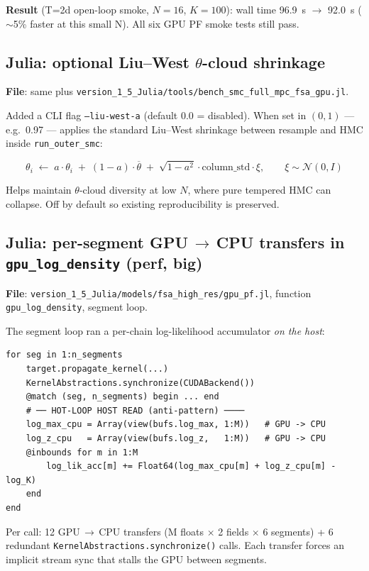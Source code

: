 \documentclass[11pt,a4paper]{article}
\begin{document}
\textbf{Result} (T=2d open-loop smoke, $N=16$, $K=100$): wall
time 96.9~s $\to$ 92.0~s ($\sim$5\% faster at this small N). All
six GPU PF smoke tests still pass.

\subsection{Julia: optional Liu--West $\theta$-cloud shrinkage}

\textbf{File}: same plus
\texttt{version\_1\_5\_Julia/tools/bench\_smc\_full\_mpc\_fsa\_gpu.jl}.

Added a CLI flag \texttt{--liu-west-a} (default 0.0 = disabled).
When set in $(0, 1)$ --- e.g.\ 0.97 --- applies the standard
Liu--West shrinkage between resample and HMC inside
\texttt{run\_outer\_smc}:

\[
  \theta_i \;\leftarrow\; a \cdot \theta_i \;+\; (1-a) \cdot \overline\theta
                  \;+\; \sqrt{1 - a^2} \cdot \text{column\_std} \cdot \xi,
                  \qquad \xi \sim \mathcal{N}(0, I)
\]

Helps maintain $\theta$-cloud diversity at low $N$, where pure
tempered HMC can collapse. Off by default so existing
reproducibility is preserved.

\subsection{Julia: per-segment GPU\,$\to$\,CPU transfers in
            \texttt{gpu\_log\_density} (perf, big)}\label{sec:bug_segment}

\textbf{File}: \texttt{version\_1\_5\_Julia/models/fsa\_high\_res/gpu\_pf.jl},
function \texttt{gpu\_log\_density}, segment loop.

The segment loop ran a per-chain log-likelihood accumulator
\emph{on the host}:

\begin{lstlisting}
for seg in 1:n_segments
    target.propagate_kernel(...)
    KernelAbstractions.synchronize(CUDABackend())
    @match (seg, n_segments) begin ... end
    # ── HOT-LOOP HOST READ (anti-pattern) ────
    log_max_cpu = Array(view(bufs.log_max, 1:M))   # GPU -> CPU
    log_z_cpu   = Array(view(bufs.log_z,   1:M))   # GPU -> CPU
    @inbounds for m in 1:M
        log_lik_acc[m] += Float64(log_max_cpu[m] + log_z_cpu[m] - log_K)
    end
end
\end{lstlisting}

Per call: 12 GPU\,$\to$\,CPU transfers (M floats $\times$ 2 fields
$\times$ 6 segments) + 6 redundant
\texttt{KernelAbstractions.synchronize()} calls. Each transfer
forces an implicit stream sync that stalls the GPU between segments.
\end{document}
